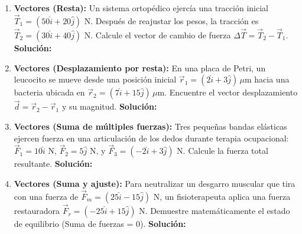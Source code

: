 \documentclass[12pt,letterpaper]{article}
\begin{document}
\begin{enumerate}
    \item \textbf{Vectores (Resta):} Un sistema ortopédico ejercía una tracción inicial $\vec{T}_1 = (50\hat{i} + 20\hat{j})$ N. Después de reajustar los pesos, la tracción es $\vec{T}_2 = (30\hat{i} + 40\hat{j})$ N. Calcule el vector de cambio de fuerza $\Delta\vec{T} = \vec{T}_2 - \vec{T}_1$.
    \textbf{Solución:} \\

    
    \item \textbf{Vectores (Desplazamiento por resta):} En una placa de Petri, un leucocito se mueve desde una posición inicial $\vec{r}_1 = (2\hat{i} + 3\hat{j}) \, \mu\text{m}$ hacia una bacteria ubicada en $\vec{r}_2 = (7\hat{i} + 15\hat{j}) \, \mu\text{m}$. Encuentre el vector desplazamiento $\vec{d} = \vec{r}_2 - \vec{r}_1$ y su magnitud.
    \textbf{Solución:} \\

    \item \textbf{Vectores (Suma de múltiples fuerzas):} Tres pequeñas bandas elásticas ejercen fuerza en una articulación de los dedos durante terapia ocupacional: $\vec{F}_1 = 10\hat{i}$ N, $\vec{F}_2 = 5\hat{j}$ N, y $\vec{F}_3 = (-2\hat{i} + 3\hat{j})$ N. Calcule la fuerza total resultante.
    \textbf{Solución:} \\

    
    \item \textbf{Vectores (Suma y ajuste):} Para neutralizar un desgarro muscular que tira con una fuerza de $\vec{F}_m = (25\hat{i} - 15\hat{j})$ N, un fisioterapeuta aplica una fuerza restauradora $\vec{F}_r = (-25\hat{i} + 15\hat{j})$ N. Demuestre matemáticamente el estado de equilibrio (Suma de fuerzas = 0).
    \textbf{Solución:} \\

\end{enumerate}
\end{document}
